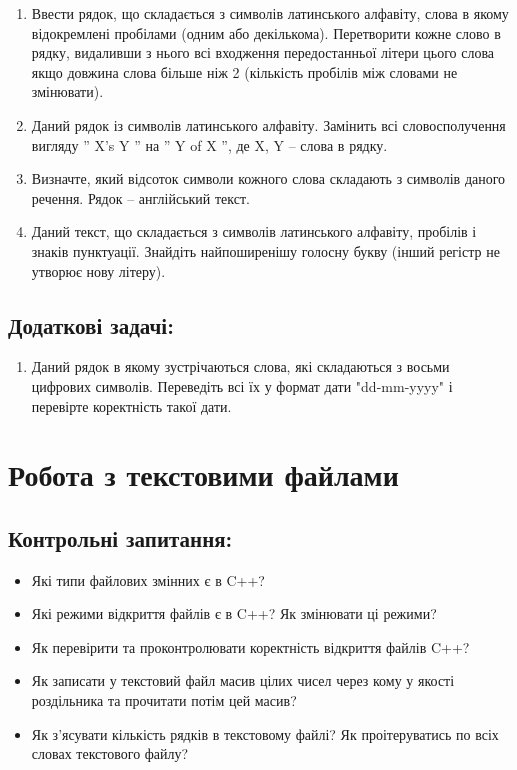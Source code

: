 \documentclass[a5paper,titlepage,openany,twoside,
]
{book_unv}%
\begin{document}
\begin{enumerate}
\begin{enumerate}
\item
 Ввести рядок, що складається з символів латинського алфавіту, слова в якому
  відокремлені пробілами (одним або декількома). Перетворити кожне слово в
  рядку, видаливши з нього всі входження передостанньої літери цього 
  слова якщо довжина слова більше ніж 2 (кількість пробілів між словами не змінювати).

\item
Даний рядок із символів латинського алфавіту. Замінить всі словосполучення
вигляду '' X's Y '' на '' Y of X '', де X, Y -- слова в рядку.

\item
  Визначте, який відсоток символи кожного слова складають з символів
  даного речення. Рядок -- англійський текст.
\item
  Даний текст, що складається з символів латинського алфавіту, пробілів і
  знаків пунктуації. Знайдіть найпоширенішу голосну букву 
(інший регістр не утворює нову літеру).


\end{enumerate}

\section{Додаткові задачі:}

\begin{enumerate}
\def\labelenumi{\arabic{enumi})}
\setcounter{enumi}{24}
\item
  Даний рядок в якому зустрічаються слова, які складаються з восьми
  цифрових символів. Переведіть всі їх у формат дати "dd-mm-yyyy" і
  перевірте коректність такої дати.
\end{enumerate}




\chapter{Робота з текстовими файлами}
%

\section{Контрольні запитання:}
\begin{itemize}
\item
 Які типи файлових змінних є в C++?
\item
 Які режими відкриття файлів є в C++? Як змінювати ці режими?
\item
 Як перевірити та проконтролювати коректність відкриття файлів C++?
\item
  Як записати у текстовий файл масив цілих чисел через кому у якості
  роздільника та прочитати потім цей масив?
\item
  Як з'ясувати кількість рядків в текстовому файлі? Як проітеруватись по всіх
словах текстового файлу?


\end{itemize}
\end{enumerate}
\end{document}
